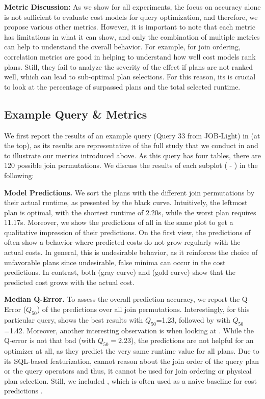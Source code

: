 \noindent\textbf{Metric Discussion:}
As we show for all experiments, the focus on accuracy alone is not sufficient to evaluate cost models for query optimization, and therefore, we propose various other metrics. 
However, it is important to note that each metric has limitations in what it can show, and only the combination of multiple metrics can help to understand the overall behavior.
For example, for join ordering, correlation metrics are good in helping to understand how well cost models rank plans. 
Still, they fail to analyze the severity of the effect if plans are not ranked well, which can lead to sub-optimal plan selections. 
For this reason, its is crucial to look at the percentage of surpassed plans and the total selected runtime.


\subsection{Example Query \& Metrics}\label{subsec:join_order_anecdotal}
We first report the results of an example query (Query $33$ from JOB-Light) in  (at the top), as its results are representative of the full study that we conduct in  and to illustrate our metrics introduced above.
As this query has four tables, there are 120 possible join permutations.
We discuss the results of each subplot ( - ) in the following:

\noindent\textbf{ Model Predictions.}
We sort the plans with the different join permutations by their actual runtime, as presented by the black curve. 
Intuitively, the leftmost plan is optimal, with the shortest runtime of 2.20s, while the worst plan requires 11.17s.
Moreover, we show the predictions of all \lcms in the same plot to get a qualitative impression of their predictions. 
On the first view, the predictions of \lcms often show a behavior where predicted costs do not grow regularly with the actual costs.
In general, this is undesirable behavior, as it reinforces the choice of unfavorable plans since undesirable, false minima can occur in the cost predictions. 
In contrast, both \postgresx (gray curve) and \postgresxvi (gold curve) show that the predicted cost grows with the actual cost.

\noindent\textbf{ Median Q-Error.}
To assess the overall prediction accuracy, we report the Q-Error ($Q_{50}$) of the predictions over all join permutations.
Interestingly, for this particular query, \postgresxvi shows the best results with $Q_{50}$=1.23, followed by \postgresx with  $Q_{50}$=1.42.
Moreover, another interesting observation is when looking at \mscn.
While the Q-error is not that bad (with $Q_{50} = 2.23$), the predictions are not helpful for an optimizer at all, as they predict the very same runtime value for all plans. 
Due to its SQL-based featurization, \mscn cannot reason about the join order of the query plan or the query operators and thus, it cannot be used for join ordering or physical plan selection.
Still, we included \mscn, which is often used as a naive baseline for cost predictions \cite{liu2022, hilprecht2022, zhao2022}.

